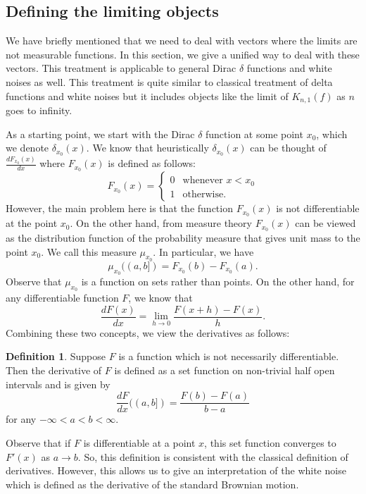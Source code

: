 \documentclass[reqno,12pt]{amsart}
\theoremstyle{plain}
\theoremstyle{definition}
\newtheorem{definition}{Definition}
\begin{document}
\subsection{Defining the limiting objects}\label{subsec:delta}
We have briefly mentioned that we need to deal with vectors where the limits are not measurable functions. In this section, we give a unified way to deal with these vectors. This treatment is applicable to general Dirac $\delta$ functions and white noises as well. This treatment is quite similar to classical treatment of delta functions and white noises but it includes objects like the limit of $K_{n,1}(f)$ as $n$ goes to infinity.

\noindent 
As a starting point, we start with the Dirac $\delta$ function at some point $x_{0}$, which we denote $\delta_{x_{0}}(x)$. We know that heuristically $\delta_{x_{0}}(x)$ can be thought of $\frac{dF_{x_{0}}(x)}{dx}$ where $F_{x_{0}}(x)$ is defined as follows:
\begin{equation}
F_{x_{0}}(x)= \left\{
\begin{array}{ll}
0 & \text{whenever $x < x_{0}$}\\
1 & \text{otherwise.}
\end{array}
\right.
\end{equation}
However, the main problem here is that the function $F_{x_{0}}(x)$ is not differentiable at the point $x_{0}$. On the other hand, from measure theory $F_{x_{0}}(x)$ can be viewed as the distribution function of the probability measure that gives unit mass to the point $x_{0}$. We call this measure $\mu_{x_{0}}$. In particular, we have 
\[
\mu_{x_{0}}((a,b])= F_{x_{0}}(b)- F_{x_{0}}(a).
\] 
Observe that $\mu_{x_{0}}$ is a function on sets rather than points.
On the other hand, for any differentiable function $F$, we know that 
\[
\frac{dF(x)}{dx}= \lim_{h \to 0} \frac{F(x+h)-F(x)}{h}.
\]
Combining these two concepts, we view the derivatives as follows:
\begin{definition}\label{def:derset}
Suppose $F$ is a function which is not necessarily differentiable. Then the derivative of $F$ is defined as a set function on non-trivial  half open intervals and is given by 
\[
\frac{dF}{dx}((a,b])= \frac{F(b)-F(a)}{b-a}
\]
for any $-\infty < a<b <\infty.$
\end{definition}
Observe that if $F$ is differentiable at a point $x$, this set function converges to $F'(x)$ as $a \to b$. So, this definition is consistent with the classical definition of derivatives. However, this allows us to give an interpretation of the white noise which is defined as the derivative of the standard Brownian motion. 
\end{document}
